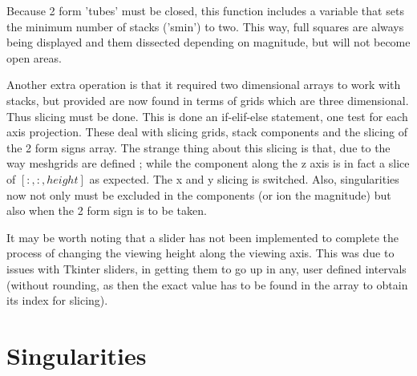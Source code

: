 \documentclass[11]{report}
\begin{document}
Because 2 form 'tubes' must be closed, this function includes a variable that sets the minimum number of stacks ('s\textunderscore min') to two. This way, full squares are always being displayed and them dissected depending on magnitude, but will not become open areas.

Another extra operation is that it required two dimensional arrays to work with stacks, but provided are now found in terms of grids which are three dimensional. Thus slicing must be done. This is done an if-elif-else statement, one test for each axis projection. These deal with slicing grids, stack components and the slicing of the 2 form signs array.
The strange thing about this slicing is that, due to the way meshgrids are defined ; while the component along the z axis is in fact a slice of $[:, :, height]$ as expected. The x and y slicing is switched.
Also, singularities now not only must be excluded in the components (or ion the magnitude) but also when the 2 form sign is to be taken.

It may be worth noting that a slider has not been implemented to complete the process of changing the viewing height along the viewing axis. This was  due to issues with Tkinter sliders, in getting them to go up in any, user defined intervals (without rounding, as then the exact value has to be found in the array to obtain its index for slicing).


\section{Singularities}
\end{document}
